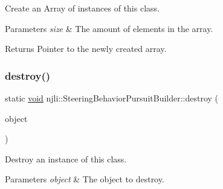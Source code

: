 Create an Array of instances of this class.


\begin{DoxyParams}{Parameters}
{\em size} & The amount of elements in the array.\\
\hline
\end{DoxyParams}
\begin{DoxyReturn}{Returns}
Pointer to the newly created array. 
\end{DoxyReturn}
\mbox{\label{classnjli_1_1_steering_behavior_pursuit_builder_a6ae203825f37b0dc68bd04a5356ae9cd}} 
\subsubsection{\texorpdfstring{destroy()}{destroy()}}
{\footnotesize\ttfamily static \mbox{\hyperlink{_thread_8h_af1e856da2e658414cb2456cb6f7ebc66}{void}} njli\+::\+Steering\+Behavior\+Pursuit\+Builder\+::destroy (\begin{DoxyParamCaption}\item[{\mbox{\hyperlink{classnjli_1_1_steering_behavior_pursuit_builder}{Steering\+Behavior\+Pursuit\+Builder}} $\ast$}]{object }\end{DoxyParamCaption})\hspace{0.3cm}{\ttfamily [static]}}

Destroy an instance of this class.


\begin{DoxyParams}{Parameters}
{\em object} & The object to destroy. \\
\hline
\end{DoxyParams}
\mbox{\label{classnjli_1_1_steering_behavior_pursuit_builder_afb5b797e2ee050335cbfe421e4211669}} 
